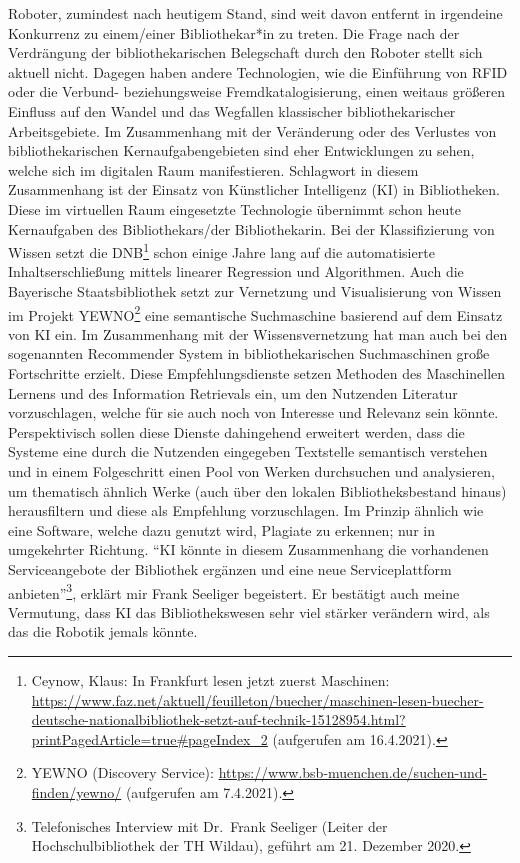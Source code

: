 \documentclass[a4paper,
fontsize=11pt,
oneside,
numbers=noperiodatend,
parskip=half-,
bibliography=totoc,
final
]{scrartcl}
\begin{document}
Roboter, zumindest nach heutigem Stand, sind weit davon entfernt in
irgendeine Konkurrenz zu einem/einer Bibliothekar*in zu treten. Die
Frage nach der Verdrängung der bibliothekarischen Belegschaft durch den
Roboter stellt sich aktuell nicht. Dagegen haben andere Technologien,
wie die Einführung von RFID oder die Verbund- beziehungsweise
Fremdkatalogisierung, einen weitaus größeren Einfluss auf den Wandel und
das Wegfallen klassischer bibliothekarischer Arbeitsgebiete. Im
Zusammenhang mit der Veränderung oder des Verlustes von
bibliothekarischen Kernaufgabengebieten sind eher Entwicklungen zu
sehen, welche sich im digitalen Raum manifestieren. Schlagwort in diesem
Zusammenhang ist der Einsatz von Künstlicher Intelligenz (KI) in
Bibliotheken. Diese im virtuellen Raum eingesetzte Technologie übernimmt
schon heute Kernaufgaben des Bibliothekars/der Bibliothekarin. Bei der
Klassifizierung von Wissen setzt die DNB\footnote{Ceynow, Klaus: In
  Frankfurt lesen jetzt zuerst Maschinen:
  \url{https://www.faz.net/aktuell/feuilleton/buecher/maschinen-lesen-buecher-deutsche-nationalbibliothek-setzt-auf-technik-15128954.html?printPagedArticle=true\#pageIndex_2}
  (aufgerufen am 16.4.2021).} schon einige Jahre lang auf die
automatisierte Inhaltserschließung mittels linearer Regression und
Algorithmen. Auch die Bayerische Staatsbibliothek setzt zur Vernetzung
und Visualisierung von Wissen im Projekt YEWNO\footnote{YEWNO (Discovery
  Service): \url{https://www.bsb-muenchen.de/suchen-und-finden/yewno/}
  (aufgerufen am 7.4.2021).} eine semantische Suchmaschine basierend auf
dem Einsatz von KI ein. Im Zusammenhang mit der Wissensvernetzung hat
man auch bei den sogenannten Recommender System in bibliothekarischen
Suchmaschinen große Fortschritte erzielt. Diese Empfehlungsdienste
setzen Methoden des Maschinellen Lernens und des Information Retrievals
ein, um den Nutzenden Literatur vorzuschlagen, welche für sie auch noch
von Interesse und Relevanz sein könnte. Perspektivisch sollen diese
Dienste dahingehend erweitert werden, dass die Systeme eine durch die
Nutzenden eingegeben Textstelle semantisch verstehen und in einem
Folgeschritt einen Pool von Werken durchsuchen und analysieren, um
thematisch ähnlich Werke (auch über den lokalen Bibliotheksbestand
hinaus) herausfiltern und diese als Empfehlung vorzuschlagen. Im Prinzip
ähnlich wie eine Software, welche dazu genutzt wird, Plagiate zu
erkennen; nur in umgekehrter Richtung. \enquote{KI könnte in diesem
Zusammenhang die vorhandenen Serviceangebote der Bibliothek ergänzen und
eine neue Serviceplattform anbieten}\footnote{Telefonisches Interview
  mit Dr.~Frank Seeliger (Leiter der Hochschulbibliothek der TH Wildau),
  geführt am 21. Dezember 2020.}, erklärt mir Frank Seeliger begeistert.
Er bestätigt auch meine Vermutung, dass KI das Bibliothekswesen sehr
viel stärker verändern wird, als das die Robotik jemals könnte.
\end{document}
